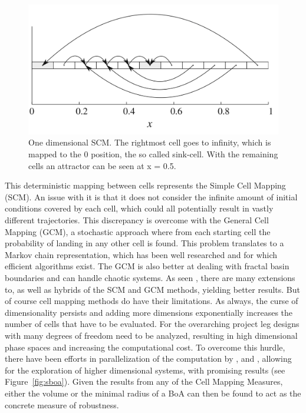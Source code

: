 \begin{figure}[h]
    
    \centering
    \includegraphics[width=.5\linewidth]{figures/1d-cm}
    \caption[One dimensional SCM]{One dimensional SCM. The rightmost cell goes to infinity, which is mapped to the 0 position, the so called sink-cell. With the remaining cells an attractor can be seen at x = 0.5. \cite{cell1}}
    \label{fig:1d-cm}
\end{figure}

This deterministic mapping between cells represents the Simple Cell Mapping (SCM). An issue with it is that it does not consider the infinite amount of initial conditions covered by each cell, which could all potentially result in vastly different trajectories. This discrepancy is overcome with the General Cell Mapping (GCM), a stochastic approach where from each starting cell the probability of landing in any other cell is found. This problem translates to a Markov chain representation, which has been well researched and for which efficient algorithms exist. The GCM is also better at dealing with fractal basin boundaries and can handle chaotic systems. As seen \cite{cell2}, there are many extensions to, as well as hybrids of the SCM and GCM methods, yielding better results. But of course cell mapping methods do have their limitations. 
As always, the curse of dimensionality persists and adding more dimensions exponentially increases the number of cells that have to be evaluated. For the overarching project leg designs with many degrees of freedom need to be analyzed, resulting in high dimensional phase spaces and increasing the computational cost. To overcome this hurdle, there have been efforts in parallelization of the computation by \cite{sixdim},\cite{parallel} and \cite{integr}, allowing for the exploration of higher dimensional systems, with promising results (see Figure~\ref{fig:sboa}). Given the results from any of the Cell Mapping Measures, either the volume or the minimal radius of a BoA can then be found to act as the concrete measure of robustness. 

